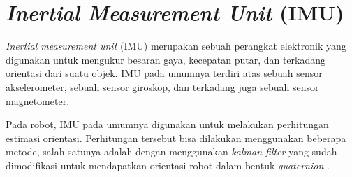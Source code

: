\section{\emph{Inertial Measurement Unit} (IMU)}
\label{sec:imu}

\emph{Inertial measurement unit} (IMU) merupakan sebuah perangkat elektronik yang digunakan untuk mengukur besaran gaya, kecepatan putar, dan terkadang orientasi dari suatu objek.
IMU pada umumnya terdiri atas sebuah sensor akselerometer,
  sebuah sensor giroskop, dan terkadang juga sebuah sensor magnetometer.

Pada robot, IMU pada umumnya digunakan untuk melakukan perhitungan estimasi orientasi.
Perhitungan tersebut bisa dilakukan menggunakan beberapa metode,
  salah satunya adalah dengan menggunakan \emph{kalman filter} yang sudah dimodifikasi untuk mendapatkan orientasi robot dalam bentuk \emph{quaternion} \citep{cit:kim2004}.
